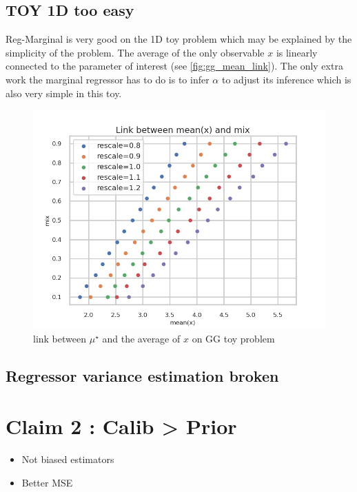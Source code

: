 \clearpage
\subsection{TOY 1D too easy}


Reg-Marginal is very good on the 1D toy problem which may be explained by the simplicity of the problem.
The average of the only observable $x$ is linearly connected to the parameter of interest (see \autoref{fig:gg_mean_link}).
The only extra work the marginal regressor has to do is to infer $\alpha$ to adjust its inference which is also very simple in this toy.

\begin{figure}[ht!]
  \centering
  \includegraphics[width=0.49\linewidth]{GG/mean_link.png}
  \caption{link between $\mu^\star$ and the average of $x$ on GG toy problem}
  \label{fig:gg_mean_link}
\end{figure}







\subsection{Regressor variance estimation broken}









\clearpage
\section{Claim 2 : Calib > Prior}

\begin{itemize}
  \item Not biased estimators
  \item Better MSE
\end{itemize}




